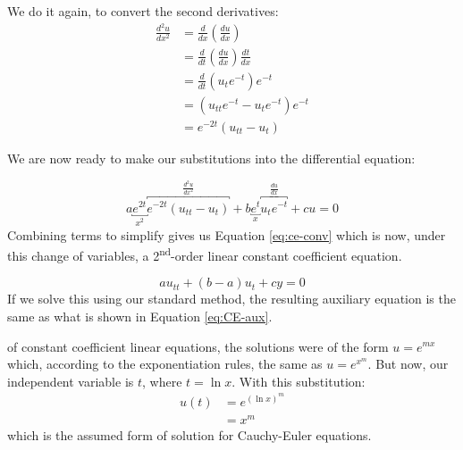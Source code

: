 We do it again, to convert the second derivatives:
\begin{align*}
\frac{d^2u}{dx^2} &= \frac{d}{dx}\left(\frac{du}{dx}\right) \\
&= \frac{d}{dt}\left(\frac{du}{dx}\right)\frac{dt}{dx} \\
&=\frac{d}{dt}\left(u_t e^{-t}\right)e^{-t} \\
&= \left(u_{tt}e^{-t}-u_te^{-t}\right)e^{-t} \\
&= e^{-2t}\left(u_{tt} - u_{t} \right)
\end{align*}

We are now ready to make our substitutions into the differential equation:

\begin{equation*}
a\underbracket{e^{2t}}_{x^2}\overbracket{e^{-2t}\left(u_{tt}-u_t\right)}^{\frac{d^2u}{dx^2}}+b\underbracket{e^{t}}_{x}\overbracket{u_te^{-t}}^{\frac{du}{dx}}+cu=0
\end{equation*}
Combining terms to simplify gives us Equation \ref{eq:ce-conv} which is now, under this change of variables, a 2\textsuperscript{nd}-order linear constant coefficient equation.

\begin{equation}
au_{tt} + (b-a)u_t + cy = 0
\label{eq:ce-conv}
\end{equation}
If we solve this using our standard method, the resulting auxiliary equation is the same as what is shown in Equation \ref{eq:CE-aux}.

 of constant coefficient linear equations, the solutions were of the form $u = e^{mx}$ which, according to the exponentiation rules, the same as $u = e^{x^m}$.  But now, our independent variable is $t$, where $t=\ln{x}$. With this substitution:
\begin{align*}
u(t) &= e^{(\ln{x})^m} \\
&= x^m
\end{align*}
which is the assumed form of solution for Cauchy-Euler equations.


